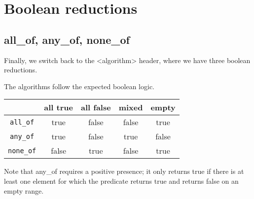 \section{Boolean reductions}

\subsection{all\_of, any\_of, none\_of}

Finally, we switch back to the <algorithm> header, where we have three boolean reductions.



The algorithms follow the expected boolean logic.

\begin{tabular}{c c c c c}
\hline
& all true & all false & mixed & empty \\
\hline
\texttt{all\_of} & true & false & false & true \\
\hline
\texttt{any\_of} & true & false & true & false \\
\hline
\texttt{none\_of} & false & true & false & true \\
\hline
\end{tabular}

Note that any\_of requires a positive presence; it only returns true if there is at least one element for which the predicate returns true and returns false on an empty range.

\begin{box-note}
\end{box-note}